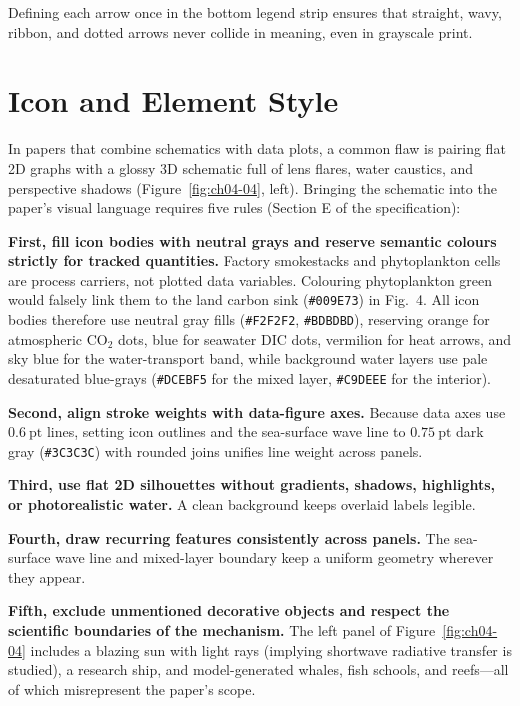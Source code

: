 Defining each arrow once in the bottom legend strip ensures that straight, wavy, ribbon, and dotted arrows never collide in meaning, even in grayscale print.

\section{Icon and Element Style}

In papers that combine schematics with data plots, a common flaw is pairing flat 2D graphs with a glossy 3D schematic full of lens flares, water caustics, and perspective shadows (Figure~\ref{fig:ch04-04}, left). Bringing the schematic into the paper's visual language requires five rules (Section E of the specification):

\textbf{First, fill icon bodies with neutral grays and reserve semantic colours strictly for tracked quantities.} Factory smokestacks and phytoplankton cells are process carriers, not plotted data variables. Colouring phytoplankton green would falsely link them to the land carbon sink (\texttt{\#009E73}) in Fig.\ 4. All icon bodies therefore use neutral gray fills (\texttt{\#F2F2F2}, \texttt{\#BDBDBD}), reserving orange for atmospheric $\text{CO}_2$ dots, blue for seawater DIC dots, vermilion for heat arrows, and sky blue for the water-transport band, while background water layers use pale desaturated blue-grays (\texttt{\#DCEBF5} for the mixed layer, \texttt{\#C9DEEE} for the interior).

\textbf{Second, align stroke weights with data-figure axes.} Because data axes use $0.6\ \text{pt}$ lines, setting icon outlines and the sea-surface wave line to $0.75\ \text{pt}$ dark gray (\texttt{\#3C3C3C}) with rounded joins unifies line weight across panels.

\textbf{Third, use flat 2D silhouettes without gradients, shadows, highlights, or photorealistic water.} A clean background keeps overlaid labels legible.

\textbf{Fourth, draw recurring features consistently across panels.} The sea-surface wave line and mixed-layer boundary keep a uniform geometry wherever they appear.

\textbf{Fifth, exclude unmentioned decorative objects and respect the scientific boundaries of the mechanism.} The left panel of Figure~\ref{fig:ch04-04} includes a blazing sun with light rays (implying shortwave radiative transfer is studied), a research ship, and model-generated whales, fish schools, and reefs---all of which misrepresent the paper's scope.


